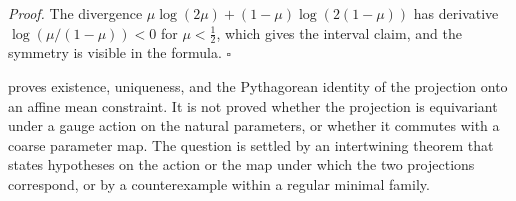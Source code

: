 \noindent\emph{Proof.}
The divergence \(\mu\log(2\mu)+(1-\mu)\log(2(1-\mu))\) has derivative
\(\log(\mu/(1-\mu))<0\) for \(\mu<\tfrac12\), which gives the interval claim,
and the symmetry is visible in the formula. \(\square\)

 proves existence, uniqueness, and the
Pythagorean identity of the projection onto an affine mean constraint. It is
not proved whether the projection is equivariant under a gauge action on the
natural parameters, or whether it commutes with a coarse parameter map. The
question is settled by an intertwining theorem that states hypotheses on the
action or the map under which the two projections correspond, or by a
counterexample within a regular minimal family.
